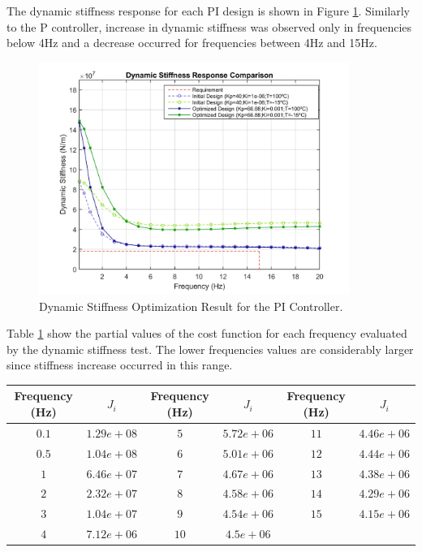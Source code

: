 The  dynamic stiffness response for each PI design is shown in Figure \ref{fig:5_1_2_PI_DynStif}. Similarly to the P controller, increase in dynamic stiffness was observed only in frequencies below 4Hz and a decrease occurred for frequencies between 4Hz and 15Hz.

\begin{figure}[H]
	\centering
	\centerline{\includegraphics[width=0.9\textwidth]{Figuras/5.OptimizationResults/5-1-2-PI-DynamicStiffnessComparison.jpg}}
	\caption{Dynamic Stiffness Optimization Result for the PI Controller.}
	\label{fig:5_1_2_PI_DynStif}
\end{figure}

Table \ref{table:5_1_2_PI_CostFunctionTable} show the partial values of the cost function for each frequency evaluated by the dynamic stiffness test. The lower frequencies values are considerably larger since stiffness increase occurred in this range. 

\begin{table}[H]
	\label{table:5_1_2_PI_CostFunctionTable}
	\centering
	\resizebox{14cm}{!} {
		\begin{tabular}{|c|c|c|c|c|c|}
			\hline
			Frequency (Hz) & $J_i$ & Frequency (Hz) & $J_i$ & Frequency (Hz) & $J_i$ \\ \hline
			$0.1$ & $1.29e+08$ & $5$ & $5.72e+06$ & $11$ & $4.46e+06$ \\ \hline
			$0.5$ & $1.04e+08$ & $6$ & $5.01e+06$ & $12$ & $4.44e+06$ \\ \hline
			$1$ & $6.46e+07$ & $7$ & $4.67e+06$ & $13$ & $4.38e+06$ \\ \hline
			$2$ & $2.32e+07$ & $8$ & $4.58e+06$ & $14$ & $4.29e+06$ \\ \hline
			$3$ & $1.04e+07$ & $9$ & $4.54e+06$ & $15$ & $4.15e+06$ \\ \hline
			$4$ & $7.12e+06$ & $10$ & $4.5e+06$ &  &  \\ \hline
	\end{tabular}}
\end{table}


